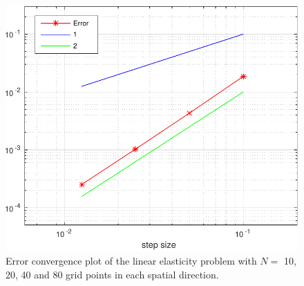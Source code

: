 \begin{figure}[ht]
\center
\includegraphics[scale=0.5]{conv_linEl}
\caption{Error convergence plot of the linear elasticity problem with $N =$ 10, 20, 40 and 80 grid points in each spatial direction.}
\label{convergence}
\end{figure}

